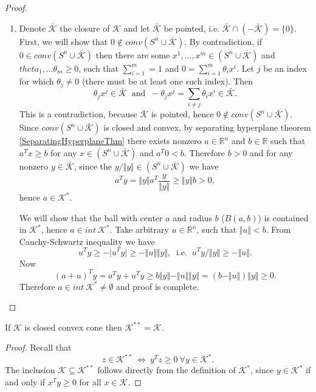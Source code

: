 \documentclass[12pt]{book}
\theoremstyle{definition}
\begin{document}
\begin{appendix}
\begin{proof}
\begin{enumerate}
\item Denote $\bar{\mathcal{K}}$ the closure of $\mathcal{K}$ and let $\bar{\mathcal{K}}$ be pointed, i.e. 
$\bar{\mathcal{K}} \cap \left(-\bar{\mathcal{K}}\right) = \{0\}$. First, we will show that $0\notin conv(S^n\cup \bar{\mathcal{K}}).$ By contradiction, if $0\in conv(S^n\cup \bar{\mathcal{K}})$ then there are some 
$x^1,\dots ,x^m \in \left(S^n\cup \bar{\mathcal{K}}\right)$ and 
$theta_1,\dots \theta_m \geq 0$, such that $\sum_{i=1}^m = 1$ and $ 0 = \sum_{i=1}^m \theta_ix^i$.
Let $j$ be an index for which $\theta_j\neq 0$ (there must be at least one such index). Then 
\begin{equation*}
\theta_jx^j \in \bar{\mathcal{K}} \ \mbox{ and } \ -\theta_jx^j= \sum_{i\neq j} \theta_ix^i \in \bar{\mathcal{K}}.
\end{equation*}
This is a contradiction, because  $\bar{\mathcal{K}}$ is pointed, hence $0\notin conv(S^n\cup \bar{\mathcal{K}}).$
Since $conv(S^n\cup \bar{\mathcal{K}})$ is closed and convex, by separating hyperplane theorem \ref{SeparatingHyperplaneThm} there exists nonzero $a\in \mathbb{R}^n$ and $b\in \mathbb{R}$ such that 
$a^Tx \geq b$ for any $x\in (S^n\cup \bar{\mathcal{K}})$ and $a^T0<b$. Therefore $b>0$ and for any nonzero $y\in  \bar{\mathcal{K}}$, since the $y/\Vert y\Vert \in (S^n\cup \bar{\mathcal{K}})$
we have 
$$a^Ty = \Vert y \Vert a^T \frac{y}{\Vert y\Vert} \geq \Vert y\Vert b > 0,$$
hence $a\in \mathcal{K}^*$.  

We will show that the ball with center $a$ and radius $b$ ($B(a,b)$) is contained in $\mathcal{K}^*$, hence $a\in int \ \mathcal{K}^*$. Take arbitrary $u\in \mathbb{R}^n$, such that $\Vert u \Vert <b$. From Cauchy-Schwartz inequality we have
$$u^Ty \geq - \vert u^Ty \vert \geq -\Vert u \Vert \Vert y \Vert, \ \mbox{ i.e. } \ u^Ty/\Vert y \Vert \geq -\Vert u \Vert.$$ Now 
$$ (a+u)^Ty = a^Ty + u^Ty \geq b\Vert y \Vert - \Vert u \Vert \Vert y \Vert = (b - \Vert u \Vert)\Vert y \Vert\geq 0.$$
Therefore $a\in int\ \mathcal{K}^* \neq \emptyset$ and proof is complete.

\end{enumerate}
\end{proof}

\prop \label{PropSecondDualofClosedCOne} If $\mathcal{K}$ is closed convex cone then $\mathcal{K}^{**} = \mathcal{K}$.

\begin{proof}
Recall that 
$$ z \in \mathcal{K}^{**} \ \Leftrightarrow \  y^Tz \geq 0 \ \forall y\in \mathcal{K}^{*}.$$
The inclusion $\mathcal{K} \subseteq \mathcal{K}^{**}$ follows directly from the definition of $\mathcal{K}^{*}$, since $y\in\mathcal{K}^{*}$ if and only if $x^Ty\geq 0$ for all $x\in \mathcal{K}$. 


\end{proof}
\end{appendix}
\end{document}
